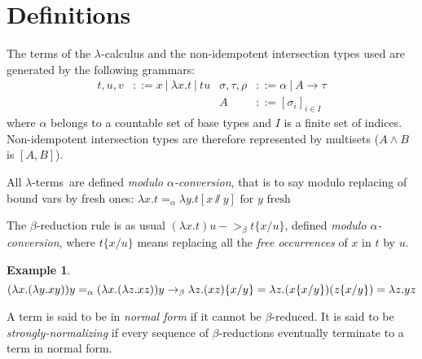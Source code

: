 \documentclass{article}
\newtheorem*{Ex*}{Example}
\def\lterms{$\lambda$-terms}
\def\aconv{$\alpha$-conversion}
\begin{document}
\section {Definitions}
\label{Defs}
The terms of the $\lambda$-calculus and the non-idempotent intersection types used are generated by the following grammars:
\begin{align*}
	t, u, v &::= x\ |\ \lambda x.t\ |\ tu 
	& \sigma, \tau, \rho &::= \alpha \ |\ A \rightarrow \tau \\
	&& A &::= [\sigma_i]_{i \in I}
\end{align*}
where $\alpha$ belongs to a countable set of base types and $I$ is a finite set of indices. Non-idempotent intersection types are therefore represented by multisets ($A\wedge B$ is $[A,B]$).

All \lterms\ are defined \emph{modulo \aconv}, that is to say modulo replacing of bound vars by fresh ones: $\lambda x.t =_\alpha \lambda y.t[x\sslash y] \text{ for $y$ fresh}$

The $\beta$-reduction rule is as usual $(\lambda x.t) u ->_\beta t\{x/u\}$, defined \emph{modulo \aconv}, where $t\{x/u\}$ means replacing all the \emph{free occurrences} of $x$ in $t$ by $u$.

\begin{Ex*}
    \begin{displaymath}
        (\lambda x.(\lambda y. xy)) y 
        =_\alpha (\lambda x.(\lambda z. xz)) y
        \\->_\beta \lambda z.(xz)\{x/y\}
        =\lambda z.(x\{x/y\})(z\{x/y\})
        = \lambda z.yz
    \end{displaymath}
\end{Ex*}

A term is said to be in \emph{normal form} if it cannot be $\beta$-reduced. It is said to be \emph{strongly-normalizing} if every sequence of $\beta$-reductions eventually terminate to a term in normal form.
\end{document}
